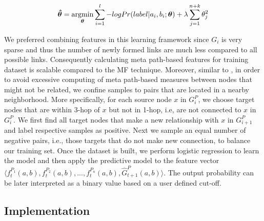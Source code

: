 
\begin{equation}
\boldsymbol{\hat{\theta}} = 
\operatorname*{argmin}\limits_{\boldsymbol{\theta}}\sum_{i=1}^l -log Pr(label |a_i, b_i; \boldsymbol{\theta}) + \lambda \sum_{j=1}^{n+k} \theta_j^2
\end{equation}
 
We preferred combining features in this learning framework since $G_i$ is very sparse and thus the number of newly formed links are much less compared to all possible links. Consequently calculating meta path-based features for training dataset is scalable compared to the MF technique. Moreover, similar to \cite{sun2011ASONAM}, in order to avoid excessive computing of meta path-based measures between nodes that might not be related, we confine samples to pairs that are located in a nearby neighborhood. More specifically, for each source node $x$ in $G^{P}_{i}$, we choose target nodes that are within 3-hop of $x$ but not in 1-hop, i.e, are not connected to $x$ in $G^{P}_{i}$. We first find all target nodes that make a new relationship with $x$  in $G^{P}_{i+1}$ and label respective samples as positive. Next we sample an equal number of negative pairs, i.e., those targets that do not make new connection, to balance our training set. Once the dataset is built, we perform logistic regression to learn the model and then apply the predictive model to the feature vector  $\langle f^{P_1}_{t}(a,b), f^{P_2}_{t}(a,b), ..., f^{P_n}_{t}(a,b), \hat{G}^{P}_{t+1}(a,b)\rangle$. The output probability can be later interpreted as a binary value based on a user defined cut-off.






\subsection{Implementation}

